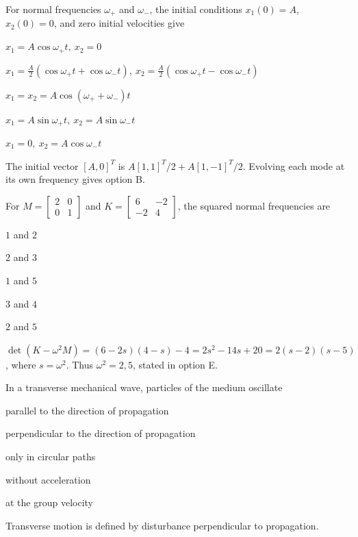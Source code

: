 \documentclass[10pt,a4paper,full]{physicsquiz}
\newcommand{\bankq}[9]{%
  \begin{quizquestion}[
    id=#1,
    topic={#2},
    difficulty=#3,
    marks=1,
    correct=#4,
    tags={#5},
    outcome={#6}
  ]
    #7
    \begin{choiceoptions}
      #8
    \end{choiceoptions}
  \end{quizquestion}
  \begin{quizsolution}
    #9
  \end{quizsolution}
}
\begin{document}
\begin{quizbank}
\bankq{modes-044}{Normal Modes}{challenge}{B}{normal-modes,initial-conditions}{Construct motion from two normal modes.}{%
For normal frequencies \(\omega_+\) and \(\omega_-\), the initial conditions \(x_1(0)=A\), \(x_2(0)=0\), and zero initial velocities give}{%
\item \(x_1=A\cos\omega_+t,\ x_2=0\)
\item \(x_1=\tfrac A2(\cos\omega_+t+\cos\omega_-t),\ x_2=\tfrac A2(\cos\omega_+t-\cos\omega_-t)\)
\item \(x_1=x_2=A\cos(\omega_++\omega_-)t\)
\item \(x_1=A\sin\omega_+t,\ x_2=A\sin\omega_-t\)
\item \(x_1=0,\ x_2=A\cos\omega_-t\)}{%
The initial vector \([A,0]^T\) is \(A[1,1]^T/2+A[1,-1]^T/2\). Evolving each mode at its own frequency gives option B.}

\bankq{modes-045}{Normal Modes}{challenge}{E}{normal-modes,generalized-eigenvalue}{Solve a generalized two-mass eigenvalue problem.}{%
For \(M=\begin{bmatrix}2&0\\0&1\end{bmatrix}\) and \(K=\begin{bmatrix}6&-2\\-2&4\end{bmatrix}\), the squared normal frequencies are}{%
\item \(1\) and \(2\)
\item \(2\) and \(3\)
\item \(1\) and \(5\)
\item \(3\) and \(4\)
\item \(2\) and \(5\)}{%
\(\det(K-\omega^2M)=(6-2s)(4-s)-4=2s^2-14s+20=2(s-2)(s-5)\), where \(s=\omega^2\). Thus \(\omega^2=2,5\), stated in option E.}


\bankq{waves-046}{Wave Properties and Classification}{foundation}{B}{waves,classification}{Classify a transverse wave.}{%
In a transverse mechanical wave, particles of the medium oscillate}{%
\item parallel to the direction of propagation
\item perpendicular to the direction of propagation
\item only in circular paths
\item without acceleration
\item at the group velocity}{%
Transverse motion is defined by disturbance perpendicular to propagation.}


\end{quizbank}
\end{document}
